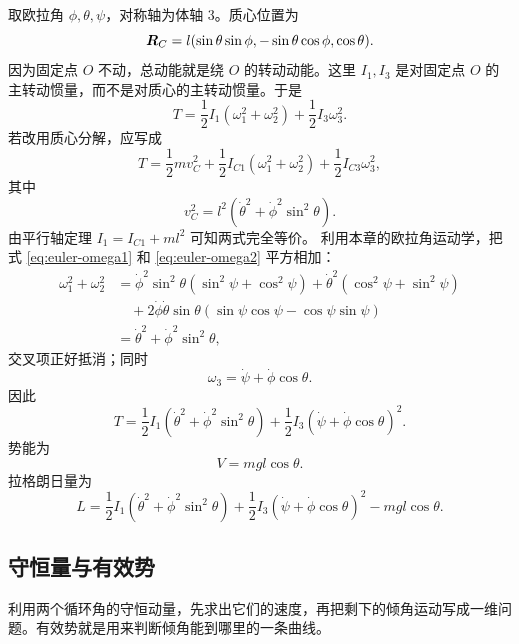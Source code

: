 取欧拉角 \(\phi,\theta,\psi\)，对称轴为体轴 3。质心位置为
\[
\boldsymbol{R}_C=l(\sin\theta\sin\phi,-\sin\theta\cos\phi,\cos\theta).
\]
因为固定点 \(O\) 不动，总动能就是绕 \(O\) 的转动动能。这里 \(I_1,I_3\) 是对固定点 \(O\) 的主转动惯量，而不是对质心的主转动惯量。于是
\[
T=\frac12I_1(\omega_1^2+\omega_2^2)+\frac12I_3\omega_3^2.
\]
若改用质心分解，应写成
\[
T=\frac12mv_C^2+\frac12I_{C1}(\omega_1^2+\omega_2^2)+\frac12I_{C3}\omega_3^2,
\]
其中
\[
v_C^2=l^2(\dot\theta^2+\dot\phi^2\sin^2\theta).
\]
由平行轴定理 \(I_1=I_{C1}+ml^2\) 可知两式完全等价。
利用本章的欧拉角运动学，把式 \eqref{eq:euler-omega1} 和 \eqref{eq:euler-omega2} 平方相加：
\[
\begin{aligned}
\omega_1^2+\omega_2^2
&=\dot\phi^2\sin^2\theta(\sin^2\psi+\cos^2\psi)
+\dot\theta^2(\cos^2\psi+\sin^2\psi)\\
&\quad+2\dot\phi\dot\theta\sin\theta
(\sin\psi\cos\psi-\cos\psi\sin\psi)\\
&=\dot\theta^2+\dot\phi^2\sin^2\theta,
\end{aligned}
\]
交叉项正好抵消；同时
\[
\omega_3=\dot\psi+\dot\phi\cos\theta.
\]
因此
\begin{equation}
T=\frac12I_1(\dot\theta^2+\dot\phi^2\sin^2\theta)
+\frac12I_3(\dot\psi+\dot\phi\cos\theta)^2.
\label{eq:lagrange-top-T}
\end{equation}
势能为
\begin{equation}
V=mgl\cos\theta.
\label{eq:lagrange-top-V}
\end{equation}
拉格朗日量为
\begin{equation}
L=\frac12I_1(\dot\theta^2+\dot\phi^2\sin^2\theta)
+\frac12I_3(\dot\psi+\dot\phi\cos\theta)^2
-mgl\cos\theta.
\label{eq:lagrange-top-L}
\end{equation}

\subsection{守恒量与有效势}

利用两个循环角的守恒动量，先求出它们的速度，再把剩下的倾角运动写成一维问题。有效势就是用来判断倾角能到哪里的一条曲线。

